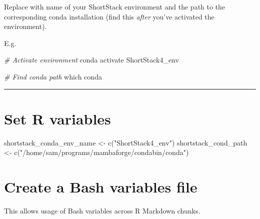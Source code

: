 \documentclass[
]{article}
\newenvironment{Shaded}{\begin{snugshade}}{\end{snugshade}}
\newcommand{\CommentTok}[1]{\textcolor[rgb]{0.56,0.35,0.01}{\textit{#1}}}
\newcommand{\ExtensionTok}[1]{#1}
\newcommand{\FunctionTok}[1]{\textcolor[rgb]{0.00,0.00,0.00}{#1}}
\newcommand{\NormalTok}[1]{#1}
\newcommand{\OtherTok}[1]{\textcolor[rgb]{0.56,0.35,0.01}{#1}}
\newcommand{\StringTok}[1]{\textcolor[rgb]{0.31,0.60,0.02}{#1}}
\begin{document}
Replace with name of your ShortStack environment and the path to the corresponding conda installation (find this \emph{after} you've activated the environment).

E.g.

\begin{Shaded}
\begin{Highlighting}[]
\CommentTok{\# Activate environment}
\ExtensionTok{conda}\NormalTok{ activate ShortStack4\_env}

\CommentTok{\# Find conda path}
\FunctionTok{which}\NormalTok{ conda}
\end{Highlighting}
\end{Shaded}

\begin{center}\rule{0.5\linewidth}{0.5pt}\end{center}

\hypertarget{set-r-variables}{%
\section{Set R variables}\label{set-r-variables}}

\begin{Shaded}
\begin{Highlighting}[]
\NormalTok{shortstack\_conda\_env\_name }\OtherTok{\textless{}{-}} \FunctionTok{c}\NormalTok{(}\StringTok{"ShortStack4\_env"}\NormalTok{)}
\NormalTok{shortstack\_cond\_path }\OtherTok{\textless{}{-}} \FunctionTok{c}\NormalTok{(}\StringTok{"/home/sam/programs/mambaforge/condabin/conda"}\NormalTok{)}
\end{Highlighting}
\end{Shaded}

\hypertarget{create-a-bash-variables-file}{%
\section{Create a Bash variables file}\label{create-a-bash-variables-file}}

This allows usage of Bash variables across R Markdown chunks.
\end{document}
